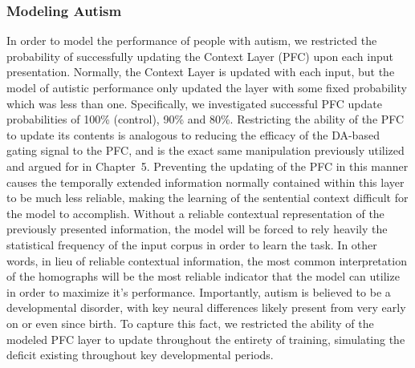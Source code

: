 \subsubsection{Modeling Autism}

In order to model the performance of people with autism, we restricted the probability of successfully updating the Context Layer (PFC) upon each input presentation.  Normally, the Context Layer is updated with each input, but the model of autistic performance only updated the layer with some fixed probability which was less than one.  Specifically, we investigated successful PFC update probabilities of 100\% (control), 90\% and 80\%.  Restricting the ability of the PFC to update its contents is analogous to reducing the efficacy of the DA-based gating signal to the PFC, and is the exact same manipulation previously utilized and argued for in Chapter~5.   Preventing the updating of the PFC in this manner causes the temporally extended information normally contained within this layer to be much less reliable, making the learning of the sentential context difficult for the model to accomplish.  Without a reliable contextual representation of the previously presented information, the model will be forced to rely heavily the statistical frequency of the input corpus in order to learn the task.  In other words, in lieu of reliable contextual information, the most common interpretation of the homographs will be the most reliable indicator that the model can utilize in order to maximize it's performance. Importantly, autism is believed to be a developmental disorder, with key neural differences likely present from very early on or even since birth.  To capture this fact, we restricted the ability of the modeled PFC layer to update throughout the entirety of training, simulating the deficit existing throughout key developmental periods.

